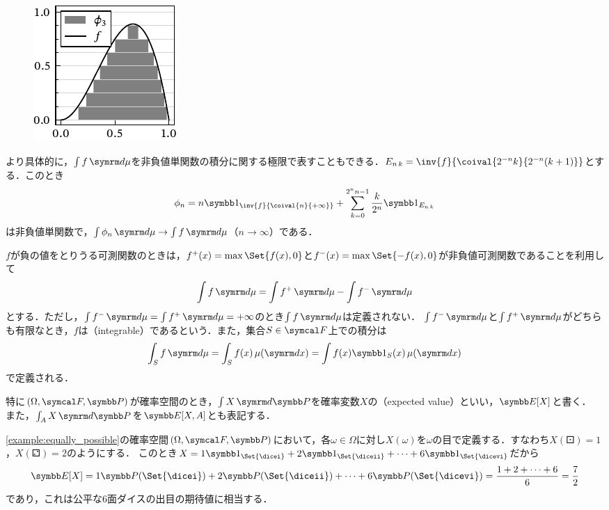\documentclass[../../main]{subfiles}
\begin{document}
\begin{figure}
  \includegraphics{figures/integration.pdf}
\end{figure}

より具体的に，\(\int f\measured{\mu}\)を非負値単関数の積分に関する極限で表すこともできる．\(\midx{E}{n}{k}=\inv{f}{\coival{2^{-n}k}{2^{-n}(k+1)}}\)とする．このとき
\[
  \phi_n = n\indicator_{\inv{f}{\coival{n}{+\infty}}}+\sum_{k=0}^{2^nn-1}\frac{k}{2^n}\indicator_{\midx{E}{n}{k}}
\]
は非負値単関数で，\(\int\phi_n\measured{\mu}\to\int f\measured{\mu}\)（\(n\to\infty\)）である．

\(f\)が負の値をとりうる可測関数のときは，\(f^{\mathord{+}}(x)=\max\Set{f(x),0}\)と\(f^{\mathord{-}}(x)=\max\Set{-f(x),0}\)が非負値可測関数であることを利用して
\[
  \int f\measured{\mu} = \int f^{\mathord{+}}\measured{\mu}-\int f^{\mathord{-}}\measured{\mu}
\]
とする．ただし，\(\int f^{\mathord{-}}\measured{\mu}=\int f^{\mathord{+}}\measured{\mu}=+\infty\)のとき\(\int f\measured{\mu}\)は定義されない．
\(\int f^{\mathord{-}}\measured{\mu}\)と\(\int f^{\mathord{+}}\measured{\mu}\)がどちらも有限なとき，\(f\)は（integrable）であるという．また，集合\(S\in\sigmaalg{F}\)上での積分は
\[
  \int_Sf\measured{\mu} = \int_Sf(x)\measured[x]{\mu}
  = \int f(x)\indicator_S(x)\measured[x]{\mu}
\]
で定義される．

特に\((\Omega,\sigmaalg{F},\prob)\)が確率空間のとき，\(\int X\measured{\prob}\)を確率変数\(X\)の（expected value）といい，\(\expval[X]\)と書く．
また，\(\int_AX\measured{\prob}\)を\(\expval[X,A]\)とも表記する．

\begin{example}
  \cref{example:equally_possible}の確率空間\((\Omega,\sigmaalg{F},\prob)\)において，各\(\omega\in\Omega\)に対し\(X(\omega)\)を\(\omega\)の目で定義する．すなわち\(X(\dicei)=1\)，\(X(\diceii)=2\)のようにする．
  このとき\(X=1\indicator_{\Set{\dicei}}+2\indicator_{\Set{\diceii}}+\dots+6\indicator_{\Set{\dicevi}}\)だから
  \[
    \expval[X] = 1\prob({\Set{\dicei}})+2\prob(\Set{\diceii})+\dots+6\prob({\Set{\dicevi}})
    = \frac{1+2+\dots+6}{6}
    = \frac{7}{2}
  \]
  であり，これは公平な6面ダイスの出目の期待値に相当する．
\end{example}
\end{document}
